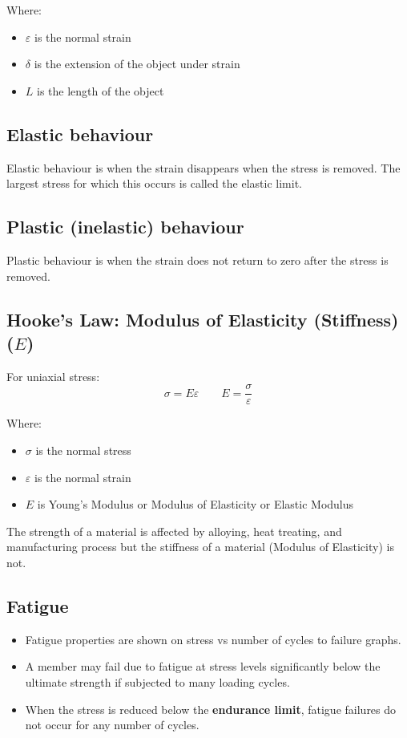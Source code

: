 \documentclass[11pt]{article}
\begin{document}
Where:
\begin{itemize}
\item \(\varepsilon\) is the normal strain
\item \(\delta\) is the extension of the object under strain
\item \(L\) is the length of the object
\end{itemize}

\subsection{Elastic behaviour}
\label{sec:org154da79}
Elastic behaviour is when the strain disappears when the stress is removed. The largest stress for which this occurs is called the elastic limit.

\subsection{Plastic (inelastic) behaviour}
\label{sec:org7e96961}
Plastic behaviour is when the strain does not return to zero after the stress is removed.

\subsection{Hooke's Law: Modulus of Elasticity (Stiffness) (\(E\))}
\label{sec:orgb157683}
For uniaxial stress:
\[\sigma = E \varepsilon \qquad E = \frac{\sigma}{\varepsilon}\]

Where:
\begin{itemize}
\item \(\sigma\) is the normal stress
\item \(\varepsilon\) is the normal strain
\item \(E\) is Young's Modulus or Modulus of Elasticity or Elastic Modulus
\end{itemize}

The strength of a material is affected by alloying, heat treating, and manufacturing process but the stiffness of a material (Modulus of Elasticity) is not.

\subsection{Fatigue}
\label{sec:orgbbed717}
\begin{itemize}
\item Fatigue properties are shown on stress vs number of cycles to failure graphs.
\item A member may fail due to fatigue at stress levels significantly below the ultimate strength if subjected to many loading cycles.
\item When the stress is reduced below the \textbf{endurance limit}, fatigue failures do not occur for any number of cycles.
\end{itemize}
\end{document}
